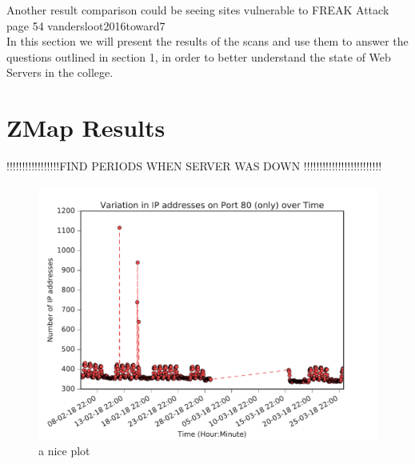 \documentclass[a4wide,leqno,12pt]{report}
\begin{document}
Another result comparison could be seeing sites vulnerable to FREAK Attack \cite{vandersloot2016toward} page 54
vandersloot2016toward7\\


In this section we will
present the results of the scans and use them to answer the questions outlined in section 1, in order to better understand the state of Web Servers in the college.


\section{ZMap Results}
!!!!!!!!!!!!!!!!!FIND PERIODS WHEN SERVER WAS DOWN !!!!!!!!!!!!!!!!!!!!!!!!!

\begin{figure}[h!]
\includegraphics[scale=.5]{pdf_images/VariationInIpAddressesOnPort80OverTime}
\caption{a nice plot}
\label{fig:port80ZMap}
\end{figure}
\end{document}
